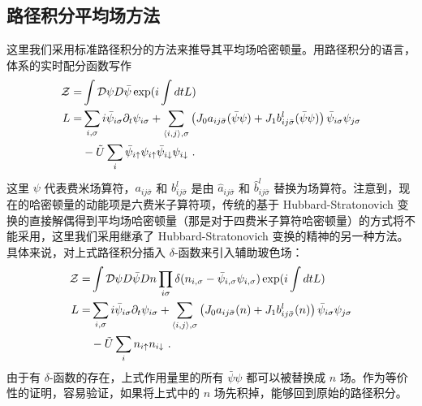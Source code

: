 \subsection{路径积分平均场方法} \label{sec:floq:pathint}
这里我们采用标准路径积分的方法来推导其平均场哈密顿量。用路径积分的语言，体系的实时配分函数写作
\begin{align}
\mathcal{Z}=&\int \mathcal D\psi D\bar\psi \exp(i\int dt L)  \\
L=&\sum_{i,\sigma} i\bar \psi_{i\sigma}\partial_t\psi_{i\sigma}+\sum_{\langle i,j\rangle, \sigma} \left(J_0a_{ij\bar{\sigma}}(\bar\psi \psi) + J_1b_{ij\bar{\sigma}}^l(\bar\psi\psi)\right)\bar \psi_{i\sigma}\psi_{j\sigma} \notag \\&- \tilde{U}\sum_{i}\bar\psi_{i\uparrow}\psi_{i\uparrow}\bar\psi_{i\downarrow}\psi_{i\downarrow} \  .
\end{align}
这里 $\psi$ 代表费米场算符，$a_{ij\bar{\sigma}}$ 和 $b_{ij\bar{\sigma}}^l$ 是由 $\hat a_{ij\bar{\sigma}}$ 和 $\hat b_{ij\bar{\sigma}}^l$ 替换为场算符。注意到，现在的哈密顿量的动能项是六费米子算符项，传统的基于 Hubbard-Stratonovich 变换的直接解偶得到平均场哈密顿量（那是对于四费米子算符哈密顿量）的方式将不能采用，这里我们采用继承了 Hubbard-Stratonovich 变换的精神的另一种方法。具体来说，对上式路径积分插入 $\delta$-函数来引入辅助玻色场：
\begin{align}
\mathcal{Z}=&\int \mathcal D\psi D\bar\psi Dn \prod_{i\sigma}\delta(n_{i,\sigma}-\bar\psi_{i,\sigma}\psi_{i,\sigma})\exp(i\int dt L)\\
L=&\sum_{i,\sigma} i\bar \psi_{i\sigma}\partial_t\psi_{i\sigma}+\sum_{\langle i,j\rangle, \sigma} \left(J_0a_{ij\bar{\sigma}}(n) + J_1b_{ij\bar{\sigma}}^l(n)\right)\bar \psi_{i\sigma}\psi_{j\sigma}  \notag \\&- \tilde{U}\sum_{i}n_{i\uparrow}n_{i\downarrow} \  .
\end{align}
由于有 $\delta$-函数的存在，上式作用量里的所有 $\bar\psi\psi$ 都可以被替换成 $n$ 场。作为等价性的证明，容易验证，如果将上式中的 $n$ 场先积掉，能够回到原始的路径积分。

